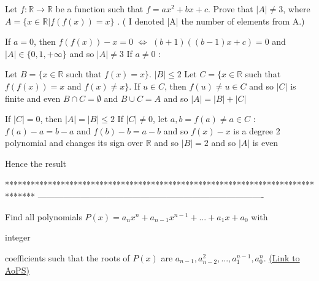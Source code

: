 \begin{solution}
	\begin{tcolorbox}Let $ f:\mathbb{R} \rightarrow \mathbb{R}$ be a function such that $f=ax^2+bx+c$. Prove that  $|A| \neq 3 $, where $A =\{x\in\mathbb{R} | f(f(x))=x\}$ . ( I denoted |A| the number of elements from A.)\end{tcolorbox}
If $a=0$, then $f(f(x))-x=0$ $\iff$ $(b+1)((b-1)x+c)=0$ and $|A|\in\{0,1,+\infty\}$ and so $|A|\ne 3$
If $a\ne 0$ :

Let $B=\{x\in\mathbb R$ such that $f(x)=x\}$. $|B|\le 2$
Let $C=\{x\in\mathbb R$ such that $f(f(x))=x$ and $f(x)\ne x\}$. If $u\in C$, then $f(u)\ne u\in C$ and so $|C|$ is finite and even
$B\cap C=\emptyset$ and $B\cup C=A$ and so $|A|=|B|+|C|$

If $|C|=0$, then $|A|=|B|\le 2$
If $|C|\ne 0$, let $a,b=f(a)\ne a\in C$ : $f(a)-a=b-a$ and $f(b)-b=a-b$ and so $f(x)-x$ is a degree 2 polynomial and changes its sign over $\mathbb R$ and so $|B|=2$ and so $|A|$ is even

Hence the result
\end{solution}
*******************************************************************************
-------------------------------------------------------------------------------

\begin{problem}
	Find all polynomials $P(x)=a_nx^n+a_{n-1}x^{n-1}+...+a_1x+a_0$ with \begin{bolded}integer\end{bolded} coefficients such that the roots of $P(x)$ are $a_{n-1}, a_{n-2}^2,...,a_1^{n-1},a_0^n$.
	\flushright \href{https://artofproblemsolving.com/community/c6h479084}{(Link to AoPS)}
\end{problem}



